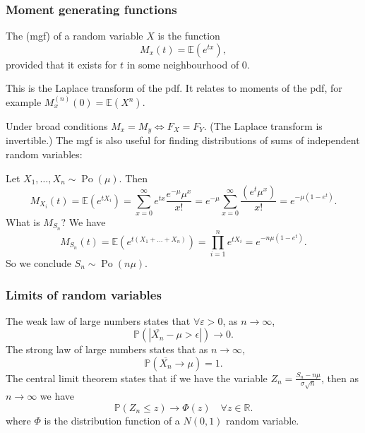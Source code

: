 \documentclass[a4paper]{scrartcl}
\begin{document}
\subsubsection*{Moment generating functions}
\begin{definition*}
     The  (mgf) of a random variable $X$ is the function \[
          M_{x}(t)=\mathbb{E}(e^{tx})
     ,\] 
     provided that it exists for $t$ in some neighbourhood of 0.
\end{definition*} This is the Laplace transform of the pdf. It relates to moments of the pdf, for example $M_{x}^{(n)}(0)=\mathbb{E} (X^{n})$. 

Under broad conditions $M_{x}=M_{y} \iff F_{X}=F_{Y}$. (The Laplace transform is invertible.) The mgf is also useful for finding distributions of sums of independent random variables: 
\begin{example*}
     Let $X_1 , \ldots ,X_n \sim \operatorname{Po}(\mu)$. Then \[
     M_{X_{i}}(t)=\mathbb{E}(e^{tX_{i}})=\sum_{x=0}^{ \infty}e^{tx} \frac{e^{-\mu}\mu^{x}}{x!}=e^{-\mu}\sum_{x=0}^{ \infty}\frac{(e^{t}\mu^{x})}{x!}=e^{-\mu (1-e^{t})}
     .\] 
     What is $M_{S_{n}}$? We have \[
     M_{S_{n}}(t)=\mathbb{E}(e^{t (X_1 +\ldots +X_n)})=\prod_{i=1}^n e^{tX_{i}}=e^{-n \mu (1-e^{t})}
     .\] So we conclude $S_{n} \sim \operatorname{Po}(n \mu)$.
\end{example*}
\subsubsection*{Limits of random variables}
The weak law of large numbers states that $\forall \varepsilon >0$, as $n \rightarrow \infty$, \[
\mathbb{P} \left(|\overline{X_n} -\mu > \epsilon|\right) \rightarrow 0
.\] 
The strong law of large numbers states that as $n \rightarrow \infty$, \[
\mathbb{P}(\overline{X_{n}} \rightarrow \mu)=1
.\] The central limit theorem states that if we have the variable $Z_{n}= \frac{S_{n}-n \mu}{\sigma \sqrt{n}}$, then as $n \rightarrow \infty$ we have \[
\mathbb{P}(Z_{n} \leq z) \rightarrow \Phi (z) \quad \forall z \in \mathbb{R}
.\] where $\Phi$ is the distribution function of a $N (0,1)$ random variable.  
\end{document}
